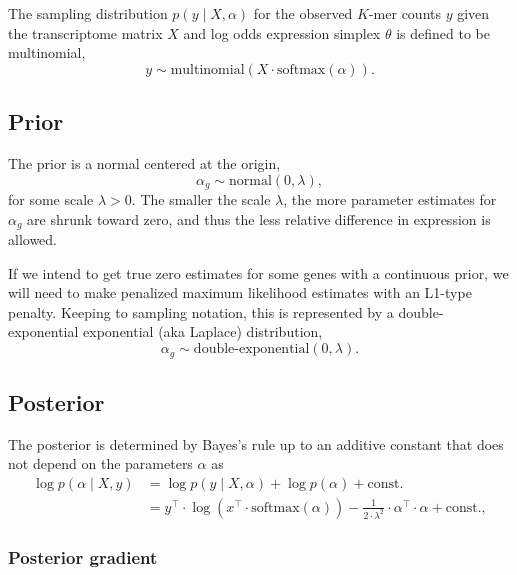 \documentclass[11pt]{article}
\begin{document}
The sampling distribution $p(y \mid X, \alpha)$  for the observed
$K$-mer counts $y$ given the transcriptome matrix $X$ and log odds
expression simplex $\theta$ is defined to be multinomial,
\[
  y \sim \textrm{multinomial}(X \cdot \textrm{softmax}(\alpha)).
\]


\subsection{Prior}

The prior is a normal centered at the origin,
\[
  \alpha_g \sim \textrm{normal}(0, \lambda),
\]
for some scale $\lambda > 0$.  The smaller the scale $\lambda$, the
more parameter estimates for $\alpha_g$ are shrunk toward zero, and
thus the less relative difference in expression is allowed.

If we intend to get true zero estimates for some genes with a
continuous prior, we will need to make penalized maximum likelihood
estimates with an L1-type penalty.  Keeping to sampling notation, this
is represented by a double-exponential exponential (aka Laplace)
distribution,
\[
  \alpha_g \sim \textrm{double-exponential}(0, \lambda).
\]

\subsection{Posterior}

The posterior is determined by Bayes's rule up to an additive constant
that does not depend on the parameters $\alpha$ as
\begin{align}
  \log p(\alpha \mid X, y)& = \log p(y \mid X, \alpha) + \log p(\alpha) +
  \textrm{const.} \nonumber \\
  &= y^{\top} \cdot \log \left( x^{\top} \cdot \textrm{softmax}(\alpha) \right)
          - \frac{1}{2 \cdot \lambda^2} \cdot \alpha^{\top} \cdot \alpha +\textrm{const.}, \nonumber
\end{align} 
 


\subsubsection{Posterior gradient}
\end{document}
